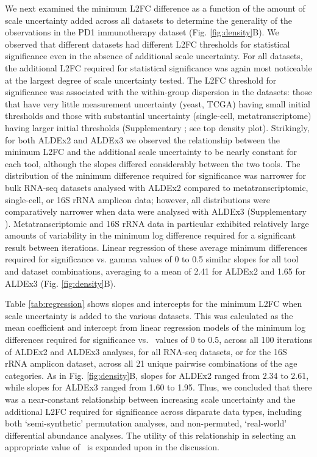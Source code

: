 \documentclass[10pt,letterpaper]{article}
\begin{document}
We next examined the minimum L2FC difference as a function of the amount of scale uncertainty added across all datasets to determine the generality of the observations in the PD1 immunotherapy dataset (Fig. \ref{fig:density}B). We observed that different datasets had different L2FC thresholds for statistical significance even in the absence of additional scale uncertainty. For all datasets, the additional L2FC required for statistical significance was again most noticeable at the largest degree of scale uncertainty tested. The L2FC threshold for significance was associated with the within-group dispersion in the datasets: those that have very little measurement uncertainty (yeast, TCGA) having small initial thresholds and those with substantial uncertainty (single-cell, metatranscriptome) having larger initial thresholds (Supplementary ; see top density plot). Strikingly, for both ALDEx2 and ALDEx3 we observed the relationship between the minimum L2FC and the additional scale uncertainty to be nearly constant for each tool, although the slopes differed considerably between the two tools. The distribution of the minimum difference required for significance was narrower for bulk RNA-seq datasets analysed with ALDEx2 compared to metatranscriptomic, single-cell, or 16S rRNA amplicon data; however, all distributions were comparatively narrower when data were analysed with ALDEx3 (Supplementary ). Metatranscriptomic and 16S rRNA data in particular exhibited relatively large amounts of variability in the minimum log difference required for a significant result between iterations. Linear regression of these average minimum differences required for significance vs. gamma values of 0 to 0.5 similar slopes for all tool and dataset combinations, averaging to a mean of 2.41 for ALDEx2 and 1.65 for ALDEx3 (Fig. \ref{fig:density}B).

Table \ref{tab:regression} shows slopes and intercepts for the minimum L2FC when scale uncertainty is added to the various datasets. This was calculated as the mean coefficient and intercept from linear regression models of the minimum log differences required for significance vs. \textgamma~values of 0 to 0.5, across all 100 iterations of ALDEx2 and ALDEx3 analyses, for all RNA-seq datasets, or for the 16S rRNA amplicon dataset, across all 21 unique pairwise combinations of the age categories. As in Fig. \ref{fig:density}B, slopes for ALDEx2 ranged from 2.34 to 2.61, while slopes for ALDEx3 ranged from 1.60 to 1.95. Thus, we concluded that there was a near-constant relationship between increasing scale uncertainty and the additional L2FC required for significance across disparate data types, including both `semi-synthetic' permutation analyses, and non-permuted, `real-world' differential abundance analyses. The utility of this relationship in selecting an appropriate value of \textgamma~is expanded upon in the discussion.
\end{document}
